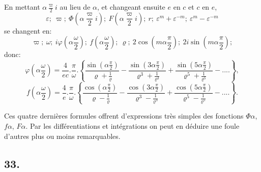 \documentclass{article}
\begin{document}
En mettant $\alpha\frac{\varpi}{2}i$ au lieu de $\alpha$, et changeant ensuite $e$ en $c$ et $c$ en $e$,
\[
\varepsilon;\ \varpi;\ \Phi\left(\alpha\frac{\varpi}{2}i\right);\ F\left(\alpha\frac{\varpi}{2}i\right);\ r;\ \varepsilon^{m}+\varepsilon^{-m};\ \varepsilon^{m}-\varepsilon^{-m}
\]
se changent en:
\[
\varpi;\ \omega;\ i\varphi\left(\alpha\frac{\omega}{2}\right);\ f\left(\alpha\frac{\omega}{2}\right);\ \varrho;\ 2\cos\left(m\alpha\frac{\pi}{2}\right);\ 2i\sin\left(m\alpha\frac{\pi}{2}\right);
\]
donc:
\[
\varphi\left(\alpha\frac{\omega}{2}\right) = \frac{4}{ec}.\frac{\pi}{\omega}.\left\{\frac{\sin\left(\alpha\frac{\pi}{2}\right)}{\varrho+\frac{1}{\varrho}}-\frac{\sin\left(3\alpha\frac{\pi}{2}\right)}{\varrho^{3}+\frac{1}{\varrho^{3}}}+\frac{\sin\left(5\alpha\frac{\pi}{2}\right)}{\varrho^{5}+\frac{1}{\varrho^{5}}}-....\right\},
\tag{206.}
\]
\[
f\left(\alpha\frac{\omega}{2}\right) = \frac{4}{e}.\frac{\pi}{\omega}.\left\{\frac{\cos\left(\alpha\frac{\pi}{2}\right)}{\varrho-\frac{1}{\varrho}}-\frac{\cos\left(3\alpha\frac{\pi}{2}\right)}{\varrho^{3}-\frac{1}{\varrho^{3}}}+\frac{\cos\left(5\alpha\frac{\pi}{2}\right)}{\varrho^{5}-\frac{1}{\varrho^{5}}}-....\right\}.
\tag{207.}
\]

Ces quatre dernières formules offrent d'expressions très simples des fonctions $\Phi\alpha$, $f\alpha$, $F\alpha$. Par les différentiations et intégrations on peut en déduire une foule d'autres plus ou moins remarquables.

\subsection*{33.}
\end{document}
